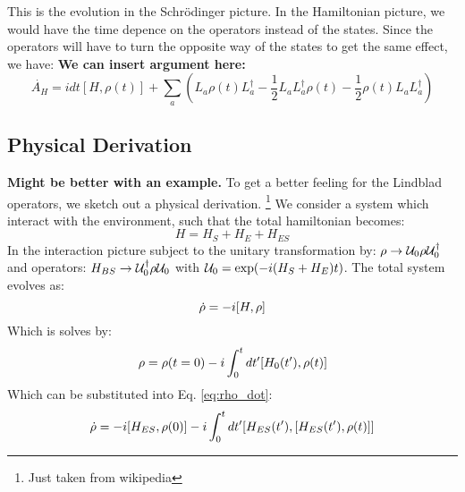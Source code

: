 This is the evolution in the Schrödinger picture. In the Hamiltonian picture, we would have the time depence on the operators instead of the states. Since the operators will have to turn the opposite way of the states to get the same effect, we have: \textbf{We can insert argument here:}
\begin{equation}
    \Dot{A_H} = i dt[H, \rho(t)] +  \sum_a \left(L_a \rho(t) L_a^\dagger - \frac12 L_a L_a^\dagger \rho(t) - \frac12 \rho(t)L_a L_a^\dagger  \right)
\end{equation}

\subsection{Physical Derivation}
\textbf{Might be better with an example.}
To get a better feeling for the Lindblad operators, we sketch out a physical derivation. \footnote{Just taken from wikipedia} We consider a system which interact with the environment, such that the total hamiltonian becomes:
\begin{equation}
    H = H_S + H_E + H_{ES}
\end{equation}
In the interaction picture subject to the unitary transformation by: $\rho \to \mathcal{U}_0 \rho \mathcal{U}_0^\dagger$ and operators: $H_{BS} \to \mathcal{U}^\dagger_0 \rho \mathcal{U}_0$ with $\mathcal{U}_0 = \exp(-i(H_S + H_E)t)$. The total system evolves as:
\begin{equation}\label{eq:rho_dot}
    \dot{\rho} = -i \comm{H}{\rho} 
\end{equation}
Which is solves by:
\begin{equation}
    \rho = \rho(t = 0) - i \int_0^t dt' \comm{H_0(t')}{\rho(t)}
\end{equation}
Which can be substituted into Eq. \ref{eq:rho_dot}:
\begin{equation}
    \dot{\rho} = -i \comm{H_{ES}}{\rho(0)} - i \int_0^t dt' \comm{H_{ES}(t')}{\comm{H_{ES}(t')}{\rho(t)}}
\end{equation}

